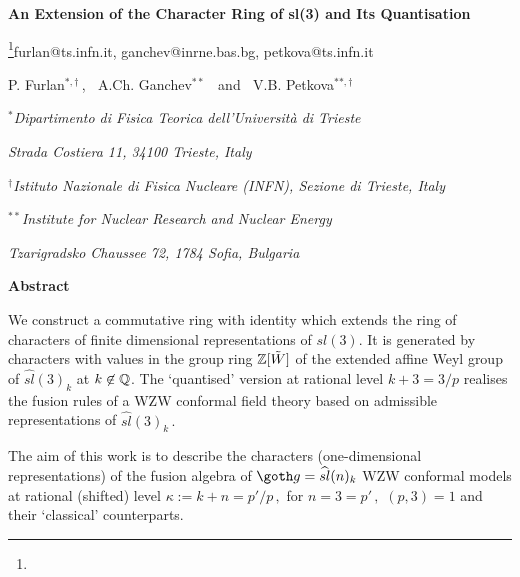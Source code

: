 \nref{}






\null
\vskip 3.5cm

\centerline{\bf  An Extension of the Character Ring of sl(3)
and Its Quantisation}\footnote{}{furlan@ts.infn.it, 
ganchev@inrne.bas.bg, petkova@ts.infn.it}

\vskip 1cm
\centerline{P. Furlan$^{*, \dagger}\, $, $\ $  A.Ch.
Ganchev$^{** }$ $ \ $
 and $\ $ V.B. Petkova$^{**, \dagger}$} 
\bigskip
\bigskip
\centerline{\it $^{*}$Dipartimento  di Fisica Teorica
 dell'Universit\`{a} di Trieste}
\centerline{\it Strada Costiera 11, 34100 Trieste, 
 Italy}
\centerline{\it $^{\dagger}$Istituto Nazionale di Fisica Nucleare
(INFN), Sezione di Trieste, Italy} 

\medskip

\centerline{\it $^{**}$Institute for Nuclear Research and
Nuclear Energy} 
\centerline{\it Tzarigradsko Chaussee 72, 1784 Sofia, 
Bulgaria}
\medskip



\bigskip\bigskip

\vskip 3cm

\centerline{\bf Abstract}
\medskip
\medskip
\medskip

We construct a commutative ring with identity which extends the
ring of characters of finite dimensional representations of
$sl(3)$. It is generated by characters with values in the group
ring $\Bbb Z[\tilde W]$ of the extended affine Weyl group of
$\widehat{sl}(3)_k$ at $k\not \in {\Bbb Q}$.  The `quantised' version at
rational level $k+3=3/p$ realises the fusion rules of a WZW
conformal field theory based on admissible representations of
$\widehat{sl}(3)_k\,.$

 
\vfil\eject

%
%

The aim of this work is to describe the characters
(one-dimensional representations) of the fusion algebra  of 
$\go=\widehat{sl}(n)_k$ WZW conformal models at rational 
(shifted) level $\kappa:=k+n=p'/p\,,$ for $n=3=p'\,, $ 
 $(p,3)=1$ and their
`classical' counterparts.


